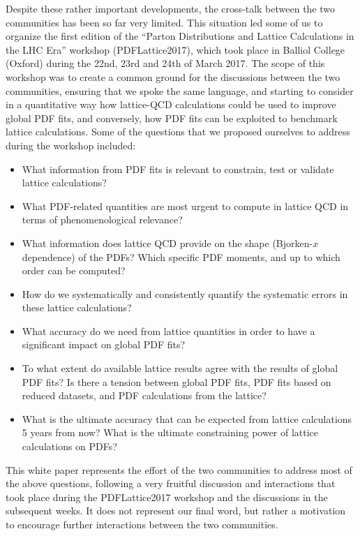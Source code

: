 Despite these rather important developments, the cross-talk between the
two communities has been so far very limited. This situation led some of us
to organize the first edition of the ``Parton Distributions and Lattice Calculations in the LHC Era''
workshop (PDFLattice2017), which took
place in Balliol College (Oxford) during the 22nd, 23rd and 24th of March 2017.
%
The scope of this workshop was to create a common ground for the discussions
between the two communities, ensuring that we spoke the same language,
and starting to consider in a quantitative way how lattice-QCD calculations could be used
to improve global PDF fits, and conversely, how PDF fits can be exploited to benchmark lattice calculations.
%
Some of the questions that we proposed ourselves to address during the workshop
included:
\begin{itemize}
\item What information from PDF fits is relevant to constrain, test or validate lattice calculations?

\item What PDF-related quantities are most urgent
  to compute in lattice QCD in terms of phenomenological relevance?

\item What information does lattice QCD provide on the
  shape (Bjorken-$x$ dependence) of the PDFs? Which specific
  PDF moments,
  and up to which order can be computed?
  
\item How do we systematically and consistently quantify the systematic errors in these lattice calculations?

\item What accuracy do we need from lattice quantities 
  in order to have a significant impact on global PDF fits?

\item To what extent do available lattice results agree with the results of
  global PDF fits? Is there a tension between global PDF fits, PDF
  fits based on reduced datasets, and PDF calculations from the lattice?

  \item What is the ultimate accuracy that can be expected from lattice
calculations 5 years from now? What is the ultimate
constraining power of lattice calculations on PDFs?

\end{itemize}

This white paper represents the effort of the two communities to address most
of the above questions, following a very fruitful discussion and interactions that took
place during the PDFLattice2017 workshop and the discussions in the subsequent weeks.
%
It does not represent our final word, but rather a motivation to encourage further
interactions between the two communities.


